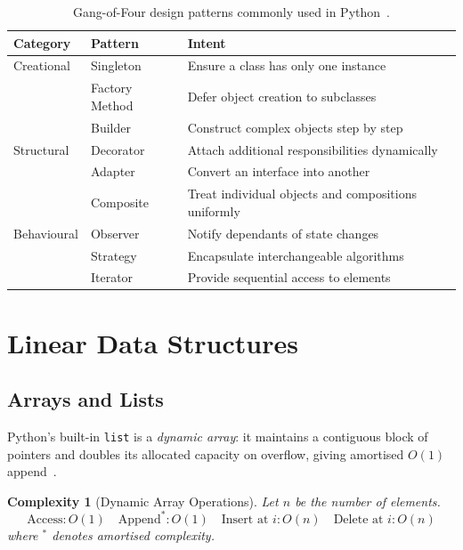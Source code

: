 \documentclass[12pt,a4paper]{article}
\newtheorem{complexity}{Complexity}[section]
\begin{document}
\begin{table}[h]
\centering
\caption{Gang-of-Four design patterns commonly used in Python~\cite{gamma1994}.}
\begin{tabular}{llp{6cm}}
\toprule
\textbf{Category} & \textbf{Pattern} & \textbf{Intent} \\
\midrule
Creational & Singleton & Ensure a class has only one instance \\
           & Factory Method & Defer object creation to subclasses \\
           & Builder & Construct complex objects step by step \\
\midrule
Structural & Decorator & Attach additional responsibilities dynamically \\
           & Adapter   & Convert an interface into another \\
           & Composite & Treat individual objects and compositions uniformly \\
\midrule
Behavioural & Observer  & Notify dependants of state changes \\
            & Strategy  & Encapsulate interchangeable algorithms \\
            & Iterator  & Provide sequential access to elements \\
\bottomrule
\end{tabular}
\end{table}

\section{Linear Data Structures}

\subsection{Arrays and Lists}

Python's built-in \texttt{list} is a \emph{dynamic array}:
it maintains a contiguous block of pointers and doubles its allocated
capacity on overflow, giving amortised $O(1)$ append~\cite{goodrich2013}.

\begin{complexity}[Dynamic Array Operations]
\label{cplx:array}
Let $n$ be the number of elements.
\[
  \text{Access}: O(1) \quad
  \text{Append}^*: O(1) \quad
  \text{Insert at } i: O(n) \quad
  \text{Delete at } i: O(n)
\]
where $^*$ denotes amortised complexity.
\end{complexity}
\end{document}
